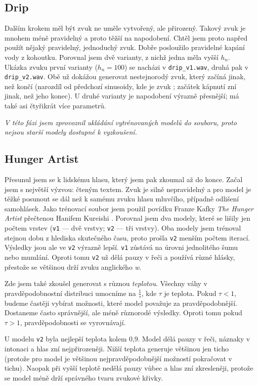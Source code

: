 \documentclass[a4]{article}
\begin{document}
\subsection{Drip}
Dalším krokem měl být zvuk ne uměle vytvořený, ale přirozený. Takový zvuk je mnohem méně pravidelný a proto těžší na napodobení. Chtěl jsem proto napřed použít nějaký pravidelný, jednoduchý zvuk. Dobře posloužilo pravidelné kapání vody z kohoutku. Porovnal jsem dvě varianty, z nichž jedna měla vyšší $h_n$. Ukázka zvuku první varianty ($h_n=100$) se nacházi v \verb|drip_v1.wav|, druhá pak v \verb|drip_v2.wav|. Obě už dokážou generovat nestejnorodý zvuk, který začíná jinak, než končí (narozdíl od předchozí sinusoidy, kde je zvuk ; začátek kápnutí zní jinak, než jeho konec). U druhé varianty je napodobení výrazně přesnější; má také asi čtyřikrát více parametrů.

\textit{V této fázi jsem zprovoznil ukládání vytrénovaných modelů do souboru, proto nejsou starší modely dostupné k vyzkoušení.}
\subsection{Hunger Artist}
Přesunul jsem se k lidskému hlasu, který jsem pak zkoumal až do konce. Začal jsem s největší výzvou: čteným textem. Zvuk je silně nepravidelný a pro model je těžké posunout se dál než k samému zvuku hlasu mluvčího, případně odlišení samohlásek. Jako trénovací soubor jsem použil povídku Franze Kafky \textit{The Hunger Artist} přečtenou Hanifem Kureishi \cite{hungerartist}.
Porovnal jsem dva modely, které se lišily jen počtem vrstev (\verb|v1| --- dvě vrstvy; \verb|v2| --- tři vrstvy). Oba modely jsem trénoval stejnou dobu z hlediska skutečného času, proto prošla \verb|v2| menším počtem iterací. Výsledky jsou ale ve \verb|v2| výrazně lepší. \verb|v1| zůstává na úrovni jednolitého šumu nebo mumlání. Oproti tomu \verb|v2| už dělá pauzy v řeči a používá různé hlásky, přestože se většinou drží zvuku anglického \textit{w}.

Zde jsem také zkoušel generovat s různou \textit{teplotou}. Všechny váhy v pravděpodobnostní distribuci umocníme na $\frac{1}{\tau}$, kde $\tau$ je teplota. Pokud $\tau<1$, budeme častěji vybírat možnosti, které model považuje za pravděpodobnější. Dostaneme často správnější, ale méně různorodé výsledky. Oproti tomu pokud $\tau > 1$, pravděpodobnosti se vyrovnávají.

U modelu \verb|v2| byla nejlepší teplota kolem 0,9. Model dělá pauzy v řeči, náznaky v intonaci a hlas zní nejpřirozeněji. Nižší teplota generuje většinou jen ticho (protože pro model je většinou nejpravděpodobnější možností pokračovat v tichu). Naopak při vyšší teplotě nedělá pauzy vůbec a hlas zní zkresleněji, protože se model méně drží správného tvaru zvukové křivky.
\end{document}
